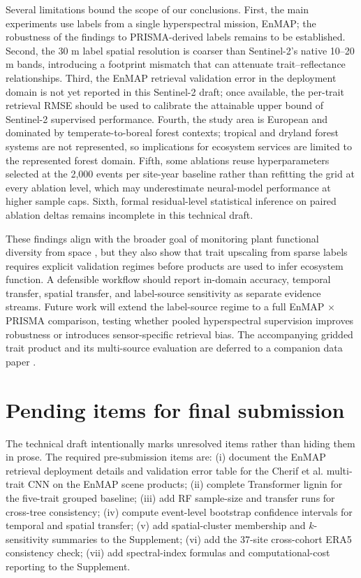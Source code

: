 \documentclass[final,times,onecolumn, authoryear]{elsarticle}
\begin{document}
\begin{linenumbers}
Several limitations bound the scope of our conclusions. First, the main experiments use labels from a single hyperspectral mission, EnMAP; the robustness of the findings to PRISMA-derived labels remains to be established. Second, the 30 m label spatial resolution is coarser than Sentinel-2's native 10--20 m bands, introducing a footprint mismatch that can attenuate trait--reflectance relationships. Third, the EnMAP retrieval validation error in the deployment domain is not yet reported in this Sentinel-2 draft; once available, the per-trait retrieval RMSE should be used to calibrate the attainable upper bound of Sentinel-2 supervised performance. Fourth, the study area is European and dominated by temperate-to-boreal forest contexts; tropical and dryland forest systems are not represented, so implications for ecosystem services are limited to the represented forest domain. Fifth, some ablations reuse hyperparameters selected at the 2,000 events per site-year baseline rather than refitting the grid at every ablation level, which may underestimate neural-model performance at higher sample caps. Sixth, formal residual-level statistical inference on paired ablation deltas remains incomplete in this technical draft.

These findings align with the broader goal of monitoring plant functional diversity from space \citep{jetz2016monitoring}, but they also show that trait upscaling from sparse labels requires explicit validation regimes before products are used to infer ecosystem function. A defensible workflow should report in-domain accuracy, temporal transfer, spatial transfer, and label-source sensitivity as separate evidence streams. Future work will extend the label-source regime to a full EnMAP $\times$ PRISMA comparison, testing whether pooled hyperspectral supervision improves robustness or introduces sensor-specific retrieval bias. The accompanying gridded trait product and its multi-source evaluation are deferred to a companion data paper \citep{jiInPreparation}.

\section*{Pending items for final submission}

The technical draft intentionally marks unresolved items rather than hiding them in prose. The required pre-submission items are: (i) document the EnMAP retrieval deployment details and validation error table for the Cherif et al. multi-trait CNN on the EnMAP scene products; (ii) complete Transformer lignin for the five-trait grouped baseline; (iii) add RF sample-size and transfer runs for cross-tree consistency; (iv) compute event-level bootstrap confidence intervals for temporal and spatial transfer; (v) add spatial-cluster membership and $k$-sensitivity summaries to the Supplement; (vi) add the 37-site cross-cohort ERA5 consistency check; (vii) add spectral-index formulas and computational-cost reporting to the Supplement.


\end{linenumbers}
\end{document}
